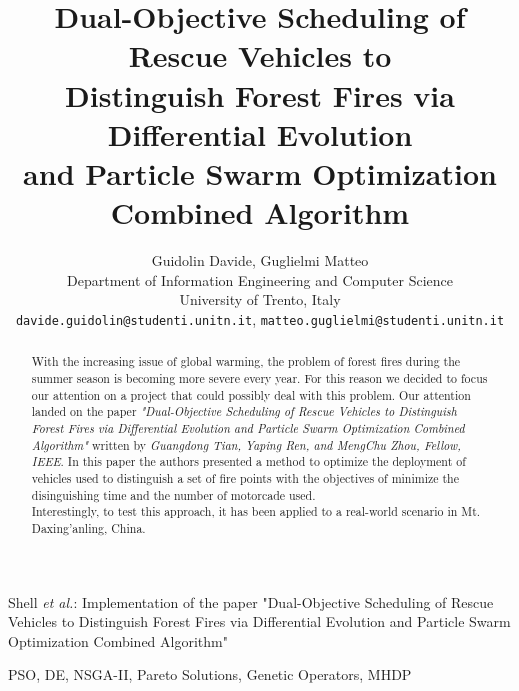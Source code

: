 \documentclass[journal]{IEEEtran}
\begin{document}

\title{Dual-Objective Scheduling of Rescue Vehicles to\\
Distinguish Forest Fires via Differential Evolution\\
and Particle Swarm Optimization\\
Combined Algorithm}

\author{Guidolin Davide,
        Guglielmi Matteo\\Department of Information Engineering and Computer Science\\University of Trento, Italy\\
\texttt{davide.guidolin@studenti.unitn.it}, \texttt{matteo.guglielmi@studenti.unitn.it}}%

%
{Shell \MakeLowercase{\textit{et al.}}: Implementation of the paper "Dual-Objective Scheduling of Rescue Vehicles to 
Distinguish Forest Fires via Differential Evolution
and Particle Swarm Optimization
Combined Algorithm"}
\maketitle

\begin{abstract}
With the increasing issue of global warming, the problem of forest fires during the summer season is becoming more severe every year.
For this reason we decided to focus our attention on a project that could possibly deal with this problem. Our attention landed on the paper 
\textit{"Dual-Objective Scheduling of Rescue Vehicles to Distinguish Forest Fires via Differential Evolution and Particle Swarm Optimization Combined Algorithm"}
written by \textit{Guangdong Tian, Yaping Ren, and MengChu Zhou, Fellow, IEEE}. 
In this paper the authors presented a method to optimize the deployment of vehicles used to distinguish a set of fire points with the objectives of minimize the disinguishing time and the number of motorcade used. \\
Interestingly, to test this approach, it has been applied to a real-world scenario in Mt. Daxing’anling, China.\\
\end{abstract}

\begin{IEEEkeywords}
    PSO, DE, NSGA-II, Pareto Solutions, Genetic Operators, MHDP
\end{IEEEkeywords}

\IEEEpeerreviewmaketitle









\newpage

\end{document}
